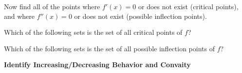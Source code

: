 \documentclass{ximera}
\begin{document}
 Now find all of the points where $f'(x)=0$ or does not exist (critical points), and where $f''(x)=0$ or does not exist (possible inflection points).
 \begin{question}
	
	
	Which of the following sets is the set of all critical points of $f$?
	
	 \begin{multipleChoice}
    \end{multipleChoice}

 \end{question}
 \begin{question}
	
	
	Which of the following sets is the set of all possible inflection points of $f$?
	
	 \begin{multipleChoice}
    \end{multipleChoice}

 \end{question}
 
 \textbf{Identify Increasing/Decreasing Behavior and Convaity}
 
\end{document}
